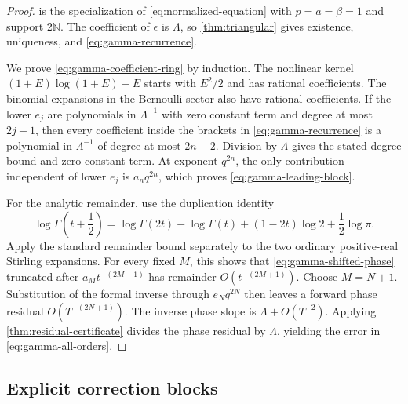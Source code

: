 \documentclass[11pt,oneside]{article}
\theoremstyle{plain}
\theoremstyle{definition}
\theoremstyle{remark}
\newcommand{\N}{\mathbb{N}}
\begin{document}
\begin{proof}
 is the specialization of
\cref{eq:normalized-equation} with \(p=a=\beta=1\) and support \(2\N\).
The coefficient of \(\epsilon\) is \(\Lambda\), so
\cref{thm:triangular} gives existence, uniqueness, and
\cref{eq:gamma-recurrence}.

We prove \cref{eq:gamma-coefficient-ring} by induction.  The nonlinear kernel
\((1+E)\log(1+E)-E\) starts with \(E^2/2\) and has rational coefficients.
The binomial expansions in the Bernoulli sector also have rational
coefficients.  If the lower \(e_j\) are polynomials in \(\Lambda^{-1}\) with
zero constant term and degree at most \(2j-1\), then every coefficient inside
the brackets in \cref{eq:gamma-recurrence} is a polynomial in
\(\Lambda^{-1}\) of degree at most \(2n-2\).  Division by \(\Lambda\) gives
the stated degree bound and zero constant term.  At exponent \(q^{2n}\), the
only contribution independent of lower \(e_j\) is \(a_nq^{2n}\), which proves
\cref{eq:gamma-leading-block}.

For the analytic remainder, use the duplication identity
\[
 \log\Gamma\!\left(t+\frac12\right)
 =\log\Gamma(2t)-\log\Gamma(t)+(1-2t)\log2+\frac12\log\pi.
\]
Apply the standard remainder bound separately to the two ordinary
positive-real Stirling expansions.  For every fixed \(M\), this shows that
\cref{eq:gamma-shifted-phase} truncated after \(a_Mt^{-(2M-1)}\) has
remainder \(O(t^{-(2M+1)})\).  Choose \(M=N+1\).  Substitution of the
formal inverse through \(e_Nq^{2N}\) then leaves a forward phase residual
\(O(T^{-(2N+1)})\).  The inverse phase slope is
\(\Lambda+O(T^{-2})\).  Applying \cref{thm:residual-certificate} divides the
phase residual by \(\Lambda\), yielding the error in
\cref{eq:gamma-all-orders}.
\end{proof}

\subsection{Explicit correction blocks}
\end{document}
